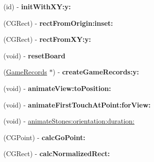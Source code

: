 \begin{DoxyCompactItemize}
\item 
\hypertarget{interface_board_view_a9b296c50f680b6066749d13efda2d665}{
(id) -\/ {\bfseries initWithXY:y:}}
\label{interface_board_view_a9b296c50f680b6066749d13efda2d665}

\item 
\hypertarget{interface_board_view_a7602d30020b9a5761ad15f66f303e589}{
(CGRect) -\/ {\bfseries rectFromOrigin:inset:}}
\label{interface_board_view_a7602d30020b9a5761ad15f66f303e589}

\item 
\hypertarget{interface_board_view_a01b2a8d349437ef4c068f46c940fd27a}{
(CGRect) -\/ {\bfseries rectFromXY:y:}}
\label{interface_board_view_a01b2a8d349437ef4c068f46c940fd27a}

\item 
\hypertarget{interface_board_view_a42c6b9837b229497508de761898b2ab6}{
(void) -\/ {\bfseries resetBoard}}
\label{interface_board_view_a42c6b9837b229497508de761898b2ab6}

\item 
\hypertarget{interface_board_view_ab81dda5b6781c4ff20bd43496456ce4c}{
(\hyperlink{interface_game_records}{GameRecords} $\ast$) -\/ {\bfseries createGameRecords:y:}}
\label{interface_board_view_ab81dda5b6781c4ff20bd43496456ce4c}

\item 
\hypertarget{interface_board_view_a479d3f7b658a5003b26316a5f40fb490}{
(void) -\/ {\bfseries animateView:toPosition:}}
\label{interface_board_view_a479d3f7b658a5003b26316a5f40fb490}

\item 
\hypertarget{interface_board_view_ac124cbbf405c711685621df3ea0466f5}{
(void) -\/ {\bfseries animateFirstTouchAtPoint:forView:}}
\label{interface_board_view_ac124cbbf405c711685621df3ea0466f5}

\item 
(void) -\/ \hyperlink{interface_board_view_a4314849127b847c86e832aa56c602af8}{animateStones:orientation:duration:}
\item 
\hypertarget{interface_board_view_a36070d4bfe580afaeb9ba4aee34f186e}{
(CGPoint) -\/ {\bfseries calcGoPoint:}}
\label{interface_board_view_a36070d4bfe580afaeb9ba4aee34f186e}

\item 
\hypertarget{interface_board_view_aceb17ba7e02ae18f2349466c55598919}{
(CGRect) -\/ {\bfseries calcNormalizedRect:}}
\label{interface_board_view_aceb17ba7e02ae18f2349466c55598919}

\end{DoxyCompactItemize}

